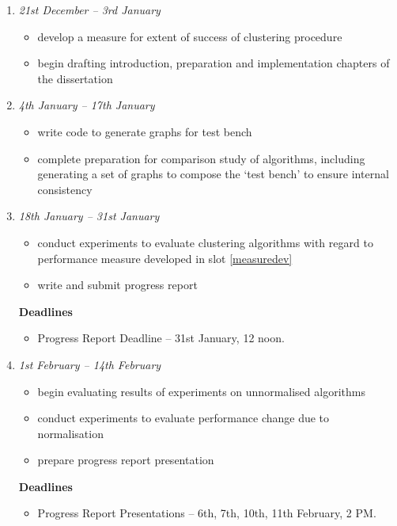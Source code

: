 \documentclass[a4paper,12pt]{article}
\begin{document}
\begin{enumerate}
 \item \label{measuredev}
 \emph{21st December -- 3rd January}
 \begin{itemize}
	\item develop a measure for extent of success of clustering procedure
	\item begin drafting introduction, preparation and implementation chapters of the 
	dissertation
 \end{itemize}
 
 \item 
 \emph{4th January -- 17th January}
 \begin{itemize}
	\item write code to generate graphs for test bench
	\item complete preparation for comparison study of algorithms, including generating a 
	set of graphs to compose the `test bench' to ensure internal consistency
 \end{itemize}
 
 \item 
 \emph{18th January -- 31st January}
 \begin{itemize}
	\item conduct experiments to evaluate clustering algorithms with regard to performance measure developed in slot \ref{measuredev}
	\item write and submit progress report
\end{itemize}
 
 \textbf{Deadlines}
 \begin{itemize}
  \item 
  Progress Report Deadline -- 31st January, 12 noon.
 \end{itemize}
 
 \item 
 \emph{1st February -- 14th February}
 \begin{itemize}
	\item begin evaluating results of experiments on unnormalised algorithms
	\item conduct experiments to evaluate performance change due to normalisation 
 	\item prepare progress report presentation
 \end{itemize}
 
 \textbf{Deadlines}
 \begin{itemize}
  \item 
  Progress Report Presentations -- 6th, 7th, 10th, 11th February, 2 PM.
 \end{itemize}
 

\end{enumerate}
\end{document}
